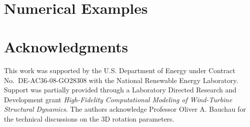 \documentclass{aiaa-tc}
\begin{document}

~
\vspace{0.1in}
~




%

\section{Numerical Examples}










\section*{Acknowledgments} 

This work was supported by the U.S. Department of Energy under Contract No.\
DE-AC36-08-GO28308 with the National Renewable Energy Laboratory. Support
was partially provided through a Laboratory Directed Research and Development grant
\textit{High-Fidelity Computational Modeling of Wind-Turbine Structural
Dynamics}. The authors acknowledge Professor Oliver A.  Bauchau for the technical
discussions on the 3D rotation parameters.
 



\end{document}
